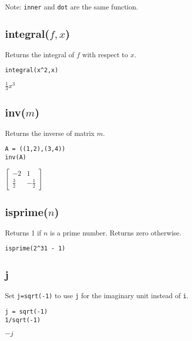 \bigskip
\noindent
Note: {\tt inner} and {\tt dot} are the same function.

\subsection*{integral($f,x$)}

Returns the integral of $f$ with respect to $x$.

{\color{blue}
\begin{verbatim}
integral(x^2,x)
\end{verbatim}
}

\noindent
$\displaystyle \tfrac{1}{3}x^3$

\subsection*{inv($m$)}

Returns the inverse of matrix $m$.

{\color{blue}
\begin{verbatim}
A = ((1,2),(3,4))
inv(A)
\end{verbatim}
}

\noindent
$\displaystyle
\begin{bmatrix}
-2 & 1\\
\tfrac{3}{2} & -\tfrac{1}{2}
\end{bmatrix}
$

\subsection*{isprime($n$)}

Returns 1 if $n$ is a prime number. Returns zero otherwise.

{\color{blue}
\begin{verbatim}
isprime(2^31 - 1)
\end{verbatim}
}


\subsection*{j}

Set {\tt j=sqrt(-1)} to use {\tt j} for the imaginary unit instead of {\tt i}.

{\color{blue}
\begin{verbatim}
j = sqrt(-1)
1/sqrt(-1)
\end{verbatim}
}

\noindent
$-j$

